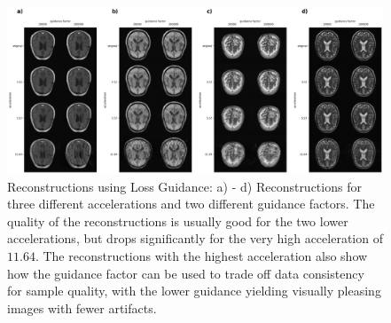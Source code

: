 \begin{figure}
    \centering
    \includegraphics[width=\textwidth]{images/directsampling_small.png}
    \caption[Reconstructions using Loss Guidance]{Reconstructions using Loss Guidance: a) - d) Reconstructions for three different accelerations and two different guidance factors. The quality of the reconstructions is usually good for the two lower accelerations, but drops significantly for the very high acceleration of $11.64$. The reconstructions with the highest acceleration also show how the guidance factor can be used to trade off data consistency for sample quality, with the lower guidance yielding visually pleasing images with fewer artifacts.}
    \label{fig:reconstructionslossguidance}
\end{figure}

